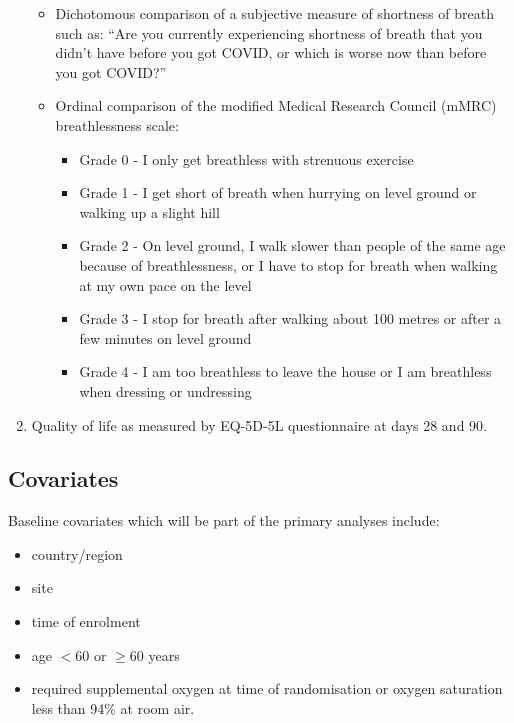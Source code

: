\documentclass[
  11pt,
]{article}
\providecommand{\tightlist}{%
  \setlength{\itemsep}{0pt}\setlength{\parskip}{0pt}}
\begin{document}
\begin{enumerate}
  \begin{itemize}
  \tightlist
  \item
    Dichotomous comparison of a subjective measure of shortness of breath such as: ``Are you currently experiencing shortness of breath that you didn't have before you got COVID, or which is worse now than before you got COVID?''
  \item
    Ordinal comparison of the modified Medical Research Council (mMRC) breathlessness scale:

    \begin{itemize}
    \tightlist
    \item
      Grade 0 - I only get breathless with strenuous exercise
    \item
      Grade 1 - I get short of breath when hurrying on level ground or walking up a slight hill
    \item
      Grade 2 - On level ground, I walk slower than people of the same age because of breathlessness, or I have to stop for breath when walking at my own pace on the level
    \item
      Grade 3 - I stop for breath after walking about 100 metres or after a few minutes on level ground
    \item
      Grade 4 - I am too breathless to leave the house or I am breathless when dressing or undressing
    \end{itemize}
  \end{itemize}
\item
  Quality of life as measured by EQ-5D-5L questionnaire at days 28 and 90.
\end{enumerate}

\hypertarget{covariates}{%
\subsection{Covariates}\label{covariates}}

Baseline covariates which will be part of the primary analyses include:

\begin{itemize}
\tightlist
\item
  country/region
\item
  site
\item
  time of enrolment
\item
  age \(<60\) or \(\geq 60\) years
\item
  required supplemental oxygen at time of randomisation or oxygen saturation less than 94\% at room air.
\end{itemize}
\end{document}
